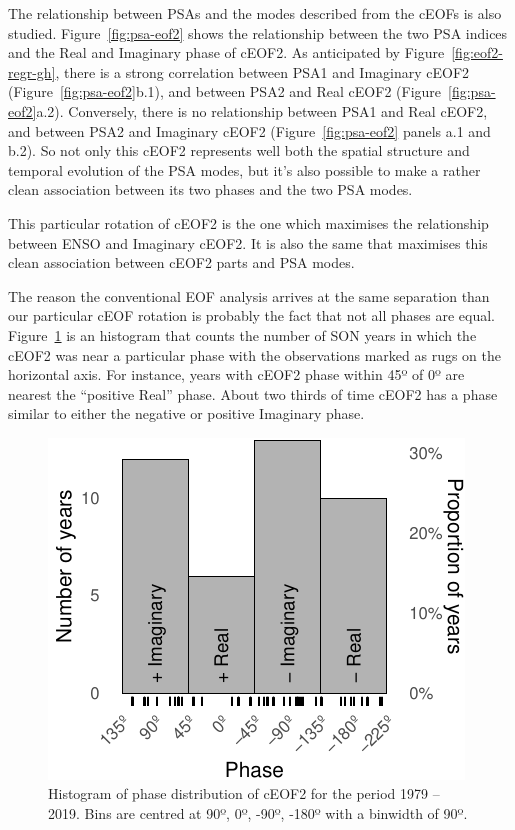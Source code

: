 \documentclass[smallextended]{svjour3}       %
\begin{document}
The relationship between PSAs and the modes described from the cEOFs is also studied. Figure~\ref{fig:psa-eof2} shows the relationship between the two PSA indices and the Real and Imaginary phase of cEOF2. As anticipated by Figure~\ref{fig:eof2-regr-gh}, there is a strong correlation between PSA1 and Imaginary cEOF2 (Figure~\ref{fig:psa-eof2}b.1), and between PSA2 and Real cEOF2 (Figure~\ref{fig:psa-eof2}a.2). Conversely, there is no relationship between PSA1 and Real cEOF2, and between PSA2 and Imaginary cEOF2 (Figure~\ref{fig:psa-eof2} panels a.1 and b.2). So not only this cEOF2 represents well both the spatial structure and temporal evolution of the PSA modes, but it's also possible to make a rather clean association between its two phases and the two PSA modes.

This particular rotation of cEOF2 is the one which maximises the relationship between ENSO and Imaginary cEOF2. It is also the same that maximises this clean association between cEOF2 parts and PSA modes.

The reason the conventional EOF analysis arrives at the same separation than our particular cEOF rotation is probably the fact that not all phases are equal. Figure~\ref{fig:phase-histogram} is an histogram that counts the number of SON years in which the cEOF2 was near a particular phase with the observations marked as rugs on the horizontal axis. For instance, years with cEOF2 phase within 45º of 0º are nearest the ``positive Real'' phase. About two thirds of time cEOF2 has a phase similar to either the negative or positive Imaginary phase.



\begin{figure}
\centering
\includegraphics{../figures/phase-histogram-1.pdf}
\caption{\label{fig:phase-histogram}Histogram of phase distribution of cEOF2 for the period 1979 -- 2019. Bins are centred at 90º, 0º, -90º, -180º with a binwidth of 90º.}
\end{figure}
\end{document}
